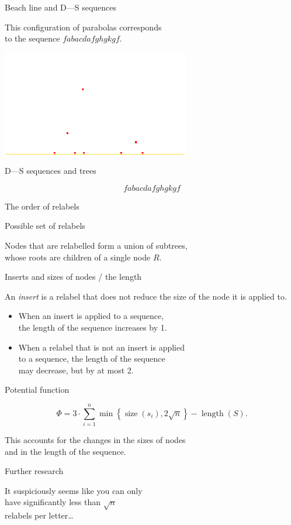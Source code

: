 \documentclass[17pt]{extarticle}
\newcommand{\newslide}[1]{\newpage \begin{center} \large #1 \end{center}}
\DeclareMathOperator{\size}{size}
\DeclareMathOperator{\length}{length}
\begin{document}
\newslide{Beach line and D—S sequences} \vspace{-7mm}

This configuration of parabolas corresponds \\
to the sequence \( fabacdafghgkgf \).

\begin{center}
	\includegraphics[height=4.6cm]{figs/parab-config-dark}
\end{center}

\newslide{D—S sequences and trees} \vspace{-12mm}
\[ fabacdafghgkgf \]



\newslide{The order of relabels}



\newslide{Possible set of relabels} \vspace{-15mm}

 \vspace{-2mm}

Nodes that are relabelled form a union of subtrees, \\
whose roots are children of a single node \(R\).

\newslide{Inserts and sizes of nodes / the length} \vspace{-6mm}

	An {\it insert} is a relabel that does not reduce the size of the node it is applied to. \vspace{-3mm}

\begin{itemize}
	\item When an insert is applied to a sequence, \\
	   the length of the sequence increases by 1.
	\item When a relabel that is not an insert is applied \\
	   to a sequence, the length of the sequence \\
	   may decrease, but by at most 2.
\end{itemize}

\newslide{Potential function}
   \[
	Φ = 3 \cdot \sum\limits_{i=1}^n
	\min\left\{ \size(s_i), 2 \sqrt{n} \right\}
	- \length (S).
   \]

This accounts for the changes in the sizes of nodes \\
and in the length of the sequence.

\newslide{Further research}

It suspiciously seems like you can only \\
have significantly less than $\sqrt{n}$ \\
relabels per letter…
\end{document}
